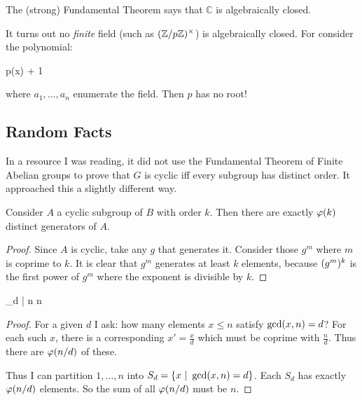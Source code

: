\begin{remark}
  The (strong) Fundamental Theorem says that $\mathbb{C}$ is
  algebraically closed.

  It turns out no \emph{finite} field (such as $\mathopen{}\left( {\mathbb{Z} / p\mathbb{Z}} \right)\mathclose{}^\times$) is
  algebraically closed. For consider the polynomial:

  \begin{nedqn}
    p(x)
  \eqcol
    \cdots
    + 1
  \end{nedqn}

  \noindent
  where $a_1, \ldots, a_n$ enumerate the field. Then $p$ has no root!
\end{remark}

\subsection{Random Facts}

\begin{remark}
  In a resource I was reading, it did not use the Fundamental Theorem of
  Finite Abelian groups to prove that $G$ is cyclic iff every subgroup
  has distinct order. It approached this a slightly different way.
\end{remark}

\begin{lemma}
  Consider $A$ a cyclic subgroup of $B$ with order $k$. Then there are
  exactly $\varphi\mathopen{}\left( {k} \right)\mathclose{}$ distinct generators of $A$.
\end{lemma}

\begin{proof}
  Since $A$ is cyclic, take any $g$ that generates it. Consider those
  $g^m$ where $m$ is coprime to $k$. It is clear that $g^m$ generates at
  least $k$ elements, because $\mathopen{}\left( {g^m} \right)\mathclose{}^k$ is the first power of
  $g^m$ where the exponent is divisible by $k$.
\end{proof}

\begin{lemma}
  \begin{nedqn}
    \sum_{d | n} 
  \eqcol
    n
  \end{nedqn}
\end{lemma}

\begin{proof}
  For a given $d$ I ask: how many elements $x \leq n$ satisfy $\gcd\mathopen{}\left( {x,
  n} \right)\mathclose{} = d$? For each such $x$, there is a corresponding $x' =
  \frac{x}{d}$ which must be coprime with $\frac{n}{d}$. Thus there are
  $\varphi\mathopen{}\left( {n/d} \right)\mathclose{}$ of these.

  Thus I can partition $1, \ldots, n$ into $S_d = \left\{ x\ |\ \gcd\mathopen{}\left( {x,
  n} \right)\mathclose{} = d \right\}$. Each $S_d$ has exactly $\varphi\mathopen{}\left( {n/d} \right)\mathclose{}$ elements. So the sum of
  all $\varphi\mathopen{}\left( {n/d} \right)\mathclose{}$ must be $n$.
\end{proof}

